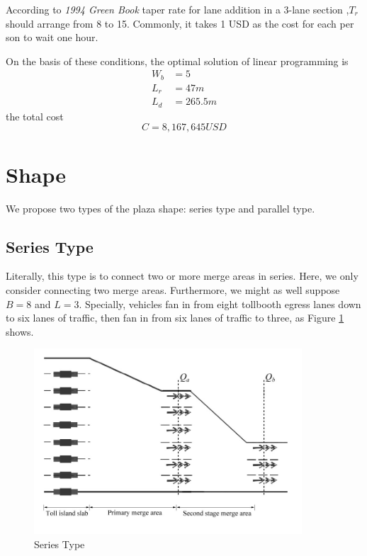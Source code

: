 \documentclass{mcmthesis}
\begin{document}
According to \emph{1994 Green Book} taper rate for lane
addition in a 3-lane section ,$T_r$ should arrange from 8
to 15. Commonly, it takes 1 USD as the cost for each per
son to wait one hour.


On the basis of these conditions, the optimal solution of
linear programming is
\begin{align}
             W_b&=5   \\
             L_r&=47m \\
             L_d&=265.5m
\end{align}
the total cost  $$C=8,167,645USD$$


\section{Shape}

We propose two types of the plaza shape:
series type and parallel type.
\subsection{Series Type}
Literally, this type is to connect two or more merge
areas in series. Here, we only consider connecting
two merge areas. Furthermore, we might as well suppose
$B=8$ and $L=3$. Specially, vehicles fan in from eight
tollbooth egress lanes down to six lanes of traffic,
then fan in from six lanes of traffic to three, as
Figure \ref{fig8} shows.
\begin{figure}[h]
\small
\centering
\includegraphics[width=10cm]{figure8}
\caption{Series Type}\label{fig8}
\end{figure}
\end{document}

